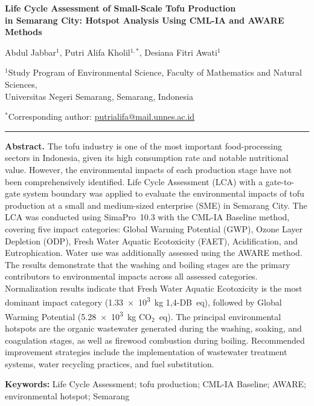 \documentclass[12pt,a4paper]{article}
\begin{document}


\begin{center}
  {\LARGE\bfseries Life Cycle Assessment of Small-Scale Tofu Production\\[4pt]
  in Semarang City: Hotspot Analysis Using CML-IA and AWARE Methods}

  \vspace{1em}

  {\large Abdul Jabbar$^{1}$,\; Putri Alifa Kholil$^{1,*}$,\; Desiana Fitri Awati$^{1}$}

  \vspace{0.4em}
  {\small $^{1}$Study Program of Environmental Science, Faculty of Mathematics and Natural Sciences,\\
  Universitas Negeri Semarang, Semarang, Indonesia}

  \vspace{0.3em}
  {\small $^{*}$Corresponding author: \href{mailto:putrialifa@mail.unnes.ac.id}{putrialifa@mail.unnes.ac.id}}
\end{center}

\vspace{0.6em}
\noindent\textcolor{ruleblue}{\rule{\linewidth}{1.2pt}}

\vspace{0.5em}
{\small
\noindent\textbf{Abstract.}\quad
The tofu industry is one of the most important food-processing sectors in Indonesia, given its high
consumption rate and notable nutritional value. However, the environmental impacts of each production
stage have not been comprehensively identified. Life Cycle Assessment (LCA) with a gate-to-gate system
boundary was applied to evaluate the environmental impacts of tofu production at a small and
medium-sized enterprise (SME) in Semarang City. The LCA was conducted using SimaPro~10.3 with the
CML-IA Baseline method, covering five impact categories: Global Warming Potential (GWP), Ozone Layer
Depletion (ODP), Fresh Water Aquatic Ecotoxicity (FAET), Acidification, and Eutrophication. Water use
was additionally assessed using the AWARE method. The results demonstrate that the washing and boiling
stages are the primary contributors to environmental impacts across all assessed categories. Normalization
results indicate that Fresh Water Aquatic Ecotoxicity is the most dominant impact category
(\num{1.33e3}~kg 1,4-DB~eq), followed by Global Warming Potential (\num{5.28e3}~kg CO$_2$~eq). The
principal environmental hotspots are the organic wastewater generated during the washing, soaking, and
coagulation stages, as well as firewood combustion during boiling. Recommended improvement strategies
include the implementation of wastewater treatment systems, water recycling practices, and fuel
substitution.

\vspace{4pt}
\noindent\textbf{Keywords:} Life Cycle Assessment; tofu production; CML-IA Baseline; AWARE;
environmental hotspot; Semarang
}
\end{document}
